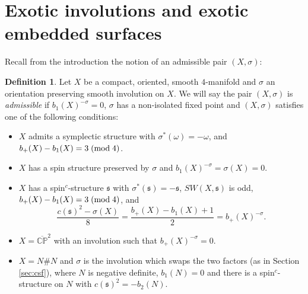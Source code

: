 \documentclass{amsart}
\theoremstyle{definition}
\newtheorem{definition}[theorem]{Definition}
\theoremstyle{remark}
\numberwithin{equation}{section}
\begin{document}
\section{Exotic involutions and exotic embedded surfaces}\label{sec:exotic}

Recall from the introduction the notion of an admissible pair $(X,\sigma)$:

\begin{definition}\label{def:admissible}
Let $X$ be a compact, oriented, smooth $4$-manifold and $\sigma$ an orientation preserving smooth involution on $X$. We will say the pair $(X , \sigma)$ is {\em admissible} if $b_1(X)^{-\sigma} = 0$, $\sigma$ has a non-isolated fixed point and $(X,\sigma)$ satisfies one of the following conditions:
\begin{itemize}
\item[(1)]{$X$ admits a symplectic structure with $\sigma^*(\omega) = -\omega$, and $b_+(X) - b_1(X) = 3 \; ({\rm mod} \; 4)$.}
\item[(2)]{$X$ has a spin structure preserved by $\sigma$ and $b_1(X)^{-\sigma} = \sigma(X) = 0$.}
\item[(3)]{$X$ has a spin$^c$-structure $\mathfrak{s}$ with $\sigma^*(\mathfrak{s}) = -\mathfrak{s}$, $SW(X,\mathfrak{s})$ is odd, $b_+(X) - b_1(X) = 3 \; ({\rm mod} \; 4)$, and
\[
\frac{ c(\mathfrak{s})^2 - \sigma(X) }{8} = \frac{ b_+(X) - b_1(X) + 1}{2} = b_+(X)^{-\sigma}.
\]
}
\item[(4)]{$X = \overline{\mathbb{CP}}^2$ with an involution such that $b_+(X)^{-\sigma} = 0$.}
\item[(5)]{$X = N \# N$ and $\sigma$ is the involution which swaps the two factors (as in Section \ref{sec:csf}), where $N$ is negative definite, $b_1(N) = 0$ and there is a spin$^c$-structure on $N$ with $c(\mathfrak{s})^2 = -b_2(N)$.}
\end{itemize}

\end{definition}
\end{document}
